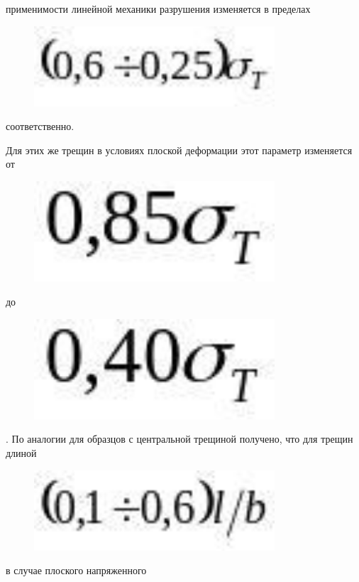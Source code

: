 применимости линейной механики разрушения изменяется в пределах
\begin{figure}[H]
	\centering
	\includegraphics[width=0.8\textwidth]{assets/1142}
	\caption*{}
\end{figure} соответственно.

Для этих же трещин в условиях плоской деформации этот параметр
изменяется от \begin{figure}[H]
	\centering
	\includegraphics[width=0.8\textwidth]{assets/1143}
	\caption*{}
\end{figure} до
\begin{figure}[H]
	\centering
	\includegraphics[width=0.8\textwidth]{assets/1144}
	\caption*{}
\end{figure}. По аналогии для образцов с
центральной трещиной получено, что для трещин длиной
\begin{figure}[H]
	\centering
	\includegraphics[width=0.8\textwidth]{assets/1145}
	\caption*{}
\end{figure} в случае плоского напряженного
